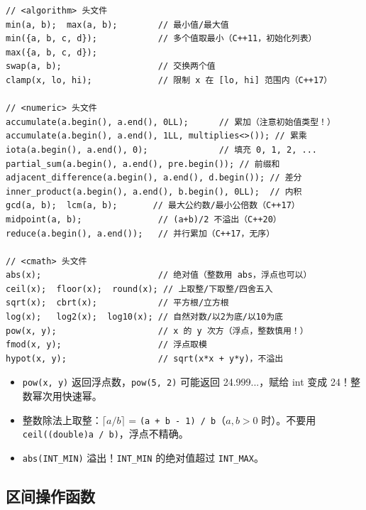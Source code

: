 \documentclass[UTF8,openany,oneside,zihao=-4]{ctexbook}
\begin{document}
\begin{lstlisting}
// <algorithm> 头文件
min(a, b);  max(a, b);        // 最小值/最大值
min({a, b, c, d});            // 多个值取最小（C++11，初始化列表）
max({a, b, c, d});
swap(a, b);                   // 交换两个值
clamp(x, lo, hi);             // 限制 x 在 [lo, hi] 范围内（C++17）

// <numeric> 头文件
accumulate(a.begin(), a.end(), 0LL);      // 累加（注意初始值类型！）
accumulate(a.begin(), a.end(), 1LL, multiplies<>()); // 累乘
iota(a.begin(), a.end(), 0);              // 填充 0, 1, 2, ...
partial_sum(a.begin(), a.end(), pre.begin()); // 前缀和
adjacent_difference(a.begin(), a.end(), d.begin()); // 差分
inner_product(a.begin(), a.end(), b.begin(), 0LL);  // 内积
gcd(a, b);  lcm(a, b);       // 最大公约数/最小公倍数（C++17）
midpoint(a, b);               // (a+b)/2 不溢出（C++20）
reduce(a.begin(), a.end());   // 并行累加（C++17，无序）

// <cmath> 头文件
abs(x);                       // 绝对值（整数用 abs，浮点也可以）
ceil(x);  floor(x);  round(x); // 上取整/下取整/四舍五入
sqrt(x);  cbrt(x);            // 平方根/立方根
log(x);   log2(x);  log10(x); // 自然对数/以2为底/以10为底
pow(x, y);                    // x 的 y 次方（浮点，整数慎用！）
fmod(x, y);                   // 浮点取模
hypot(x, y);                  // sqrt(x*x + y*y)，不溢出
\end{lstlisting}

\begin{warn}
\begin{itemize}
  \item \lstinline|pow(x, y)| 返回浮点数，\lstinline|pow(5, 2)| 可能返回 24.999...，赋给 int 变成 24！整数幂次用快速幂。
  \item 整数除法上取整：$\lceil a/b \rceil$ = \lstinline|(a + b - 1) / b|（$a, b > 0$ 时）。不要用 \lstinline|ceil((double)a / b)|，浮点不精确。
  \item \lstinline|abs(INT_MIN)| 溢出！\lstinline|INT_MIN| 的绝对值超过 \lstinline|INT_MAX|。
\end{itemize}
\end{warn}

\subsection{区间操作函数}
\end{document}

